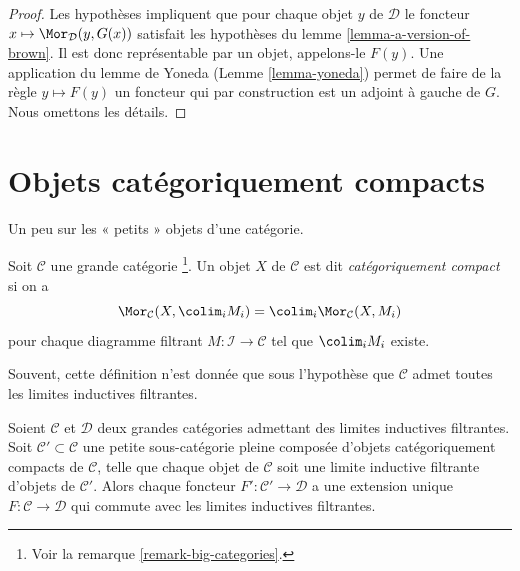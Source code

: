 \begin{proof}
Les hypothèses impliquent que pour chaque objet $y$ de $\mathcal{D}$ le
foncteur $x \mapsto \Mor_\mathcal{D}(y, G(x))$ satisfait les hypothèses du
lemme \ref{lemma-a-version-of-brown}. Il est donc représentable par un objet,
appelons-le $F(y)$. Une application du lemme de Yoneda (Lemme
\ref{lemma-yoneda}) permet de faire de la règle $y \mapsto F(y)$ un foncteur qui
par construction est un adjoint à gauche de $G$. Nous omettons les détails.
\end{proof}





\section{Objets catégoriquement compacts}
\label{section-compact}

\noindent
Un peu sur les « petits » objets d'une catégorie.

\begin{definition}
\label{definition-compact-object}
Soit $\mathcal{C}$ une grande catégorie \footnote{Voir la remarque
\ref{remark-big-categories}.}. Un objet $X$ de $\mathcal{C}$ est dit
{\it catégoriquement compact} si on a
$$
\Mor_\mathcal{C}(X, \colim_i M_i) =
\colim_i \Mor_\mathcal{C}(X, M_i)
$$
pour chaque diagramme filtrant $M : \mathcal{I} \to \mathcal{C}$ tel que
$\colim_i M_i$ existe.
\end{definition}

\noindent
Souvent, cette définition n'est donnée que sous l'hypothèse que $\mathcal{C}$
admet toutes les limites inductives filtrantes.

\begin{lemma}
\label{lemma-extend-functor-by-colim}
Soient $\mathcal{C}$ et $\mathcal{D}$ deux grandes catégories admettant des limites
inductives filtrantes. Soit $\mathcal{C}' \subset \mathcal{C}$ une petite sous-catégorie
pleine composée d'objets catégoriquement compacts de $\mathcal{C}$, telle
que chaque objet de $\mathcal{C}$ soit une limite inductive filtrante d'objets
de $\mathcal{C}'$. Alors chaque foncteur $F' : \mathcal{C}' \to \mathcal{D}$ a une extension unique $F : \mathcal{C} \to \mathcal{D}$ qui commute
avec les limites inductives filtrantes.
\end{lemma}

